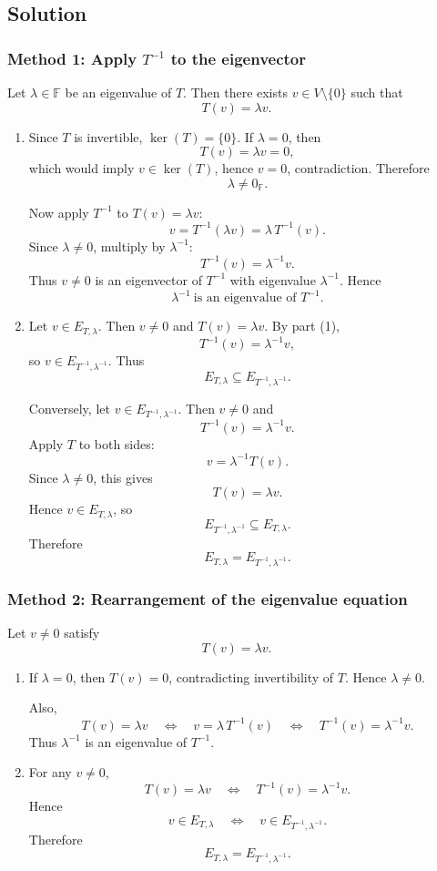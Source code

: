 \documentclass[12pt]{article}
\newcommand{\F}{\mathbb{F}}
\begin{document}
\subsection{Solution}

\subsubsection{Method 1: Apply $T^{-1}$ to the eigenvector}

Let $\lambda\in\F$ be an eigenvalue of $T$. Then there exists $v\in V\setminus\{0\}$ such that
\[
T(v)=\lambda v.
\]

\begin{enumerate}[label=(\arabic*)]
\item Since $T$ is invertible, $\ker(T)=\{0\}$. If $\lambda=0$, then
\[
T(v)=\lambda v=0,
\]
which would imply $v\in\ker(T)$, hence $v=0$, contradiction. Therefore
\[
\lambda\neq 0_{\F}.
\]

Now apply $T^{-1}$ to $T(v)=\lambda v$:
\[
v=T^{-1}(\lambda v)=\lambda\,T^{-1}(v).
\]
Since $\lambda\neq 0$, multiply by $\lambda^{-1}$:
\[
T^{-1}(v)=\lambda^{-1}v.
\]
Thus $v\neq 0$ is an eigenvector of $T^{-1}$ with eigenvalue $\lambda^{-1}$. Hence
\[
\boxed{\,\lambda^{-1}\ \text{is an eigenvalue of }T^{-1}.\,}
\]

\item Let $v\in E_{T,\lambda}$. Then $v\neq 0$ and $T(v)=\lambda v$. By part (1),
\[
T^{-1}(v)=\lambda^{-1}v,
\]
so $v\in E_{T^{-1},\lambda^{-1}}$. Thus
\[
E_{T,\lambda}\subseteq E_{T^{-1},\lambda^{-1}}.
\]

Conversely, let $v\in E_{T^{-1},\lambda^{-1}}$. Then $v\neq 0$ and
\[
T^{-1}(v)=\lambda^{-1}v.
\]
Apply $T$ to both sides:
\[
v=\lambda^{-1}T(v).
\]
Since $\lambda\neq 0$, this gives
\[
T(v)=\lambda v.
\]
Hence $v\in E_{T,\lambda}$, so
\[
E_{T^{-1},\lambda^{-1}}\subseteq E_{T,\lambda}.
\]
Therefore
\[
\boxed{\,E_{T,\lambda}=E_{T^{-1},\lambda^{-1}}.\,}
\]
\end{enumerate}

\bigskip
\subsubsection{Method 2: Rearrangement of the eigenvalue equation}

Let $v\neq 0$ satisfy
\[
T(v)=\lambda v.
\]

\begin{enumerate}[label=(\arabic*)]
\item If $\lambda=0$, then $T(v)=0$, contradicting invertibility of $T$. Hence $\lambda\neq 0$.

Also,
\[
T(v)=\lambda v
\quad\Longleftrightarrow\quad
v=\lambda\,T^{-1}(v)
\quad\Longleftrightarrow\quad
T^{-1}(v)=\lambda^{-1}v.
\]
Thus $\lambda^{-1}$ is an eigenvalue of $T^{-1}$.

\item For any $v\neq 0$,
\[
T(v)=\lambda v
\quad\Longleftrightarrow\quad
T^{-1}(v)=\lambda^{-1}v.
\]
Hence
\[
v\in E_{T,\lambda}
\quad\Longleftrightarrow\quad
v\in E_{T^{-1},\lambda^{-1}}.
\]
Therefore
\[
\boxed{\,E_{T,\lambda}=E_{T^{-1},\lambda^{-1}}.\,}
\]
\end{enumerate}
\end{document}
